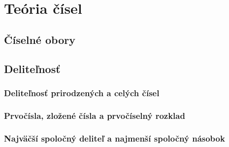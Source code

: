 \chapter{Teória čísel}
\label{chap:tc-ss}

\section{Číselné obory}


\section{Deliteľnosť}

\subsection{Deliteľnosť prirodzených a celých čísel}

\subsection{Prvočísla, zložené čísla a prvočíselný rozklad}

\subsection{Najväčší spoločný deliteľ a najmenší spoločný násobok}